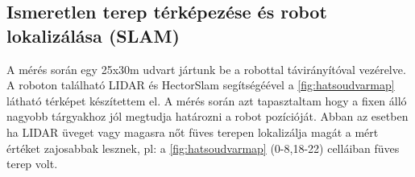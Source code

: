 \renewcommand{\GlobalPath}{Meresek/Mozgasok/GyergyoFuvesUdvar/M1/}
\renewcommand{\plotRotSpeed}{o}
\renewcommand{\plotSpeed}{o}
%

\renewcommand{\GlobalPath}{Meresek/Mozgasok/M6/}
%

\renewcommand{\GlobalPath}{Meresek/Mozgasok/SzobaElore/}
%

\renewcommand{\GlobalPath}{Meresek/Mozgasok/SzobaBalraDiff/}
%

%






\newpage

\subsection{Ismeretlen terep térképezése és robot lokalizálása (SLAM)}

A mérés során egy 25x30m udvart jártunk be a robottal távirányítóval vezérelve. A roboton található LIDAR és HectorSlam segítségéével a \ref{fig:hatsoudvarmap} látható térképet készítettem el. A mérés során azt tapasztaltam hogy a fixen álló nagyobb tárgyakhoz jól megtudja határozni a robot pozícióját. Abban az esetben ha LIDAR üveget vagy magasra nőt füves terepen lokalizálja magát a mért értéket zajosabbak lesznek, pl: a \ref{fig:hatsoudvarmap} (0-8,18-22) celláiban füves terep volt.


